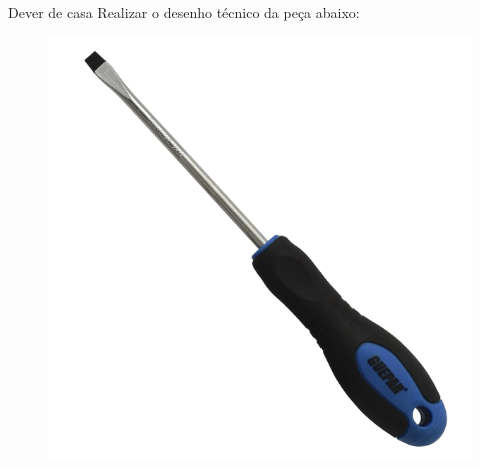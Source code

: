 \documentclass{cubeamer}
\begin{document}
\begin{frame}{Dever de casa}
    Realizar o desenho técnico da peça abaixo:
    \newline
    \begin{center}
        \begin{figure}
            \centering
            \includegraphics[height = 0.5\textheight]{img/dever1.png}
            \caption{\cite{Chavede:online}}
        \end{figure}
    \end{center}
    
\end{frame}
\end{document}
